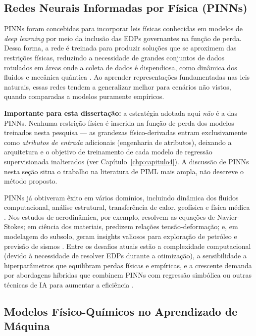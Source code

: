 \subsection{Redes Neurais Informadas por Física (PINNs)}
\label{subsec:pinns}

PINNs foram concebidas para incorporar leis físicas conhecidas em modelos de \textit{deep learning} por meio da inclusão das EDPs governantes na função de perda. Dessa forma, a rede é treinada para produzir soluções que se aproximem das restrições físicas, reduzindo a necessidade de grandes conjuntos de dados rotulados em áreas onde a coleta de dados é dispendiosa, como dinâmica dos fluidos e mecânica quântica \cite{raissi2019pinns}. Ao aprender representações fundamentadas nas leis naturais, essas redes tendem a generalizar melhor para cenários não vistos, quando comparadas a modelos puramente empíricos.

\textbf{Importante para esta dissertação:} a estratégia adotada aqui \emph{não} é a das PINNs. Nenhuma restrição física é inserida na função de perda dos modelos treinados nesta pesquisa — as grandezas físico-derivadas entram exclusivamente como \emph{atributos de entrada} adicionais (engenharia de atributos), deixando a arquitetura e o objetivo de treinamento de cada modelo de regressão supervisionada inalterados (ver Capítulo~\ref{chp:capitulo4}). A discussão de PINNs nesta seção situa o trabalho na literatura de PIML mais ampla, não descreve o método proposto.

PINNs já obtiveram êxito em vários domínios, incluindo dinâmica dos fluidos computacional, análise estrutural, transferência de calor, geofísica e física médica \cite{cuomo2022physics,toscano2024pikan,cai2021heat,haghighat2020solid}. Nos estudos de aerodinâmica, por exemplo, resolvem as equações de Navier-Stokes; em ciência dos materiais, predizem relações tensão-deformação; e, em modelagem do subsolo, geram insights valiosos para exploração de petróleo e previsão de sismos \cite{toscano2024pikan,jin2021nsfnets}. Entre os desafios atuais estão a complexidade computacional (devido à necessidade de resolver EDPs durante a otimização), a sensibilidade a hiperparâmetros que equilibram perdas físicas e empíricas, e a crescente demanda por abordagens híbridas que combinem PINNs com regressão simbólica ou outras técnicas de IA para aumentar a eficiência \cite{cuomo2022physics,toscano2024pikan,wang2021deep}.

\subsection{Modelos Físico-Químicos no Aprendizado de Máquina}
\label{subsec:modelos-fisicoquimicos}

